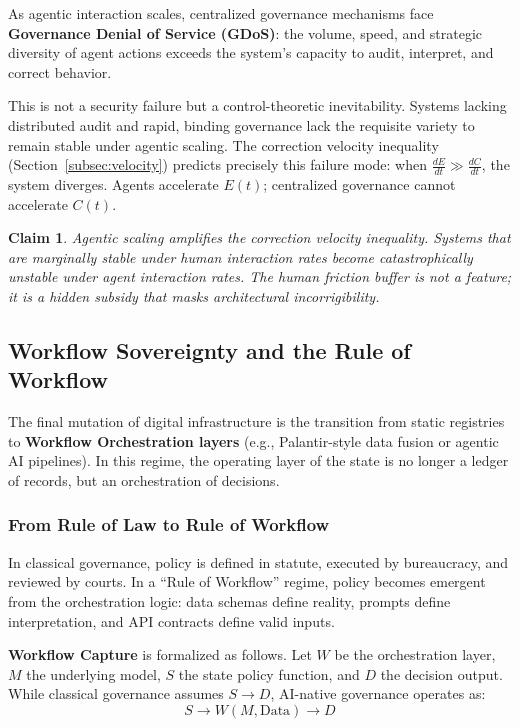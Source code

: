\documentclass{article}
\newtheorem{claim}{Claim}
\begin{document}
As agentic interaction scales, centralized governance mechanisms face \textbf{Governance Denial of Service (GDoS)}: the volume, speed, and strategic diversity of agent actions exceeds the system's capacity to audit, interpret, and correct behavior.

This is not a security failure but a control-theoretic inevitability. Systems lacking distributed audit and rapid, binding governance lack the requisite variety to remain stable under agentic scaling. The correction velocity inequality (Section~\ref{subsec:velocity}) predicts precisely this failure mode: when $\frac{dE}{dt} \gg \frac{dC}{dt}$, the system diverges. Agents accelerate $E(t)$; centralized governance cannot accelerate $C(t)$.

\begin{claim}
Agentic scaling amplifies the correction velocity inequality. Systems that are marginally stable under human interaction rates become catastrophically unstable under agent interaction rates. The human friction buffer is not a feature; it is a hidden subsidy that masks architectural incorrigibility.
\end{claim}

\subsection{Workflow Sovereignty and the Rule of Workflow}
\label{subsec:workflow-sovereignty}

The final mutation of digital infrastructure is the transition from static registries to \textbf{Workflow Orchestration layers} (e.g., Palantir-style data fusion or agentic AI pipelines). In this regime, the operating layer of the state is no longer a ledger of records, but an orchestration of decisions.

\subsubsection{From Rule of Law to Rule of Workflow}

In classical governance, policy is defined in statute, executed by bureaucracy, and reviewed by courts. In a ``Rule of Workflow'' regime, policy becomes emergent from the orchestration logic: data schemas define reality, prompts define interpretation, and API contracts define valid inputs.

\textbf{Workflow Capture} is formalized as follows. Let $W$ be the orchestration layer, $M$ the underlying model, $S$ the state policy function, and $D$ the decision output. While classical governance assumes $S \rightarrow D$, AI-native governance operates as:
\begin{equation}
S \rightarrow W(M, \text{Data}) \rightarrow D
\end{equation}
\end{document}
